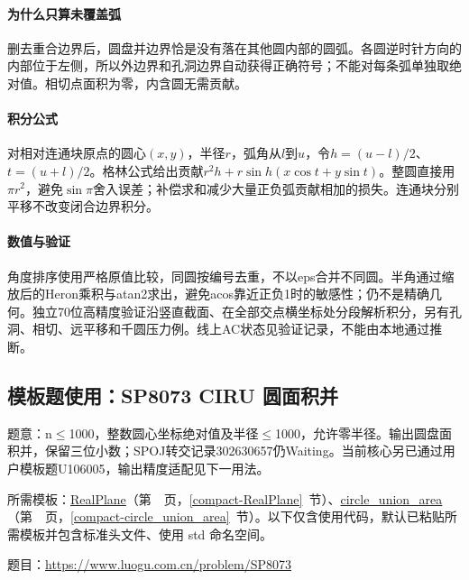 \newpage

\paragraph{为什么只算未覆盖弧} 删去重合边界后，圆盘并边界恰是没有落在其他圆内部的圆弧。各圆逆时针方向的内部位于左侧，所以外边界和孔洞边界自动获得正确符号；不能对每条弧单独取绝对值。相切点面积为零，内含圆无需贡献。

\paragraph{积分公式} 对相对连通块原点的圆心$(x,y)$，半径$r$，弧角从$l$到$u$，令$h=(u-l)/2$、$t=(u+l)/2$。格林公式给出贡献$r^2h+r\sin h(x\cos t+y\sin t)$。整圆直接用$\pi r^2$，避免$\sin\pi$舍入误差；补偿求和减少大量正负弧贡献相加的损失。连通块分别平移不改变闭合边界积分。

\paragraph{数值与验证} 角度排序使用严格原值比较，同圆按编号去重，不以eps合并不同圆。半角通过缩放后的Heron乘积与atan2求出，避免acos靠近正负1时的敏感性；仍不是精确几何。独立70位高精度验证沿竖直截面、在全部交点横坐标处分段解析积分，另有孔洞、相切、远平移和千圆压力例。线上AC状态见验证记录，不能由本地通过推断。

\Needspace{285pt}

\subsection*{模板题使用：SP8073 CIRU 圆面积并}

\label{usage-example-398}

题意：n$\le$1000，整数圆心坐标绝对值及半径$\le$1000，允许零半径。输出圆盘面积并，保留三位小数；SPOJ转交记录302630657仍Waiting。当前核心另已通过用户模板题U106005，输出精度适配见下一用法。

所需模板：\hyperref[compact-RealPlane]{RealPlane}（第~\pageref{compact-RealPlane}~页，\ref{compact-RealPlane}~节）、\hyperref[compact-circle_union_area]{circle\_\allowbreak{}union\_\allowbreak{}area}（第~\pageref{compact-circle_union_area}~页，\ref{compact-circle_union_area}~节）。以下仅含使用代码，默认已粘贴所需模板并包含标准头文件、使用 std 命名空间。

题目：\url{https://www.luogu.com.cn/problem/SP8073}



